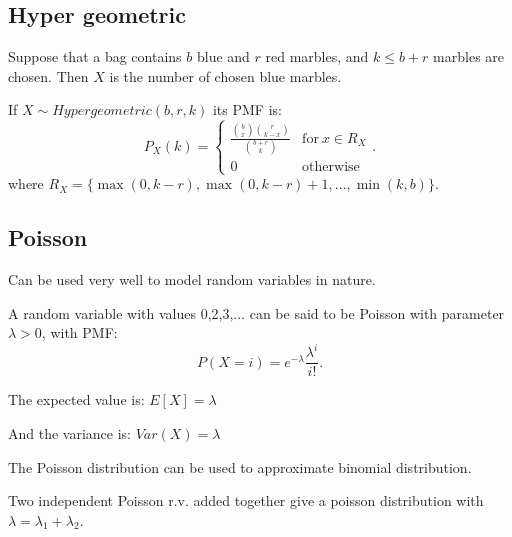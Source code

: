 \subsection{Hyper geometric}

Suppose that a bag contains $b$ blue and $r$ red marbles, and $k \leq b + r$ marbles are chosen.
Then $X$ is the number of chosen blue marbles.

\begin{definition}
    If $X \sim Hypergeometric(b,r,k)$ its PMF is: \[
        P_X(k) = \left\{
            \begin{array}{ll}
                \frac{\binom{b}{x} \binom{r}{k-x}}{\binom{b+r}{k}} & \mathrm{for} \: x \in R_X \\
                0 & \mathrm{otherwise}
            \end{array}
            \right.
    .\] 
    where $R_X = \{\max(0, k-r), \max(0,k-r)+1,...,\min(k,b)\}$.
\end{definition}

\subsection{Poisson}

Can be used very well to model random variables in nature.

\begin{definition}
    A random variable with values 0,2,3,... can be said to be Poisson with parameter $\lambda > 0$, with PMF: \[
        P(X = i) = e^{-\lambda} \frac{\lambda^i}{i!}
    .\] 
\end{definition}

The expected value is: $
    E[X] = \lambda
$ 

And the variance is: $
    Var(X) = \lambda
$ 

The Poisson distribution can be used to approximate binomial distribution.

\begin{lemma}
    Two independent Poisson r.v. added together give a poisson distribution with $\lambda = \lambda_1 + \lambda_2$.
\end{lemma}

